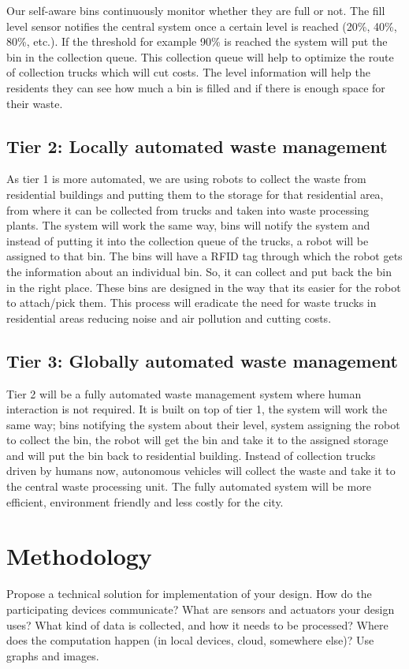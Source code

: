 \documentclass{article}
\begin{document}
Our self-aware bins continuously monitor whether they are full or not. The fill level sensor notifies the central system once a certain level is reached (20\%, 40\%, 80\%, etc.). If the threshold for example 90\% is reached the system will put the bin in the collection queue. This collection queue will help to optimize the route of collection trucks which will cut costs. The level information will help the residents they can see how much a bin is filled and if there is enough space for their waste.

\subsection{Tier 2: Locally automated waste management}

As tier 1 is more automated, we are using robots to collect the waste from residential buildings and putting them to the storage for that residential area, from where it can be collected from trucks and taken into waste processing plants. The system will work the same way, bins will notify the system and instead of putting it into the collection queue of the trucks, a robot will be assigned to that bin. The bins will have a RFID tag through which the robot gets the information about an individual bin. So, it can collect and put back the bin in the right place. These bins are designed in the way that its easier for the robot to attach/pick them. This process will eradicate the need for waste trucks in residential areas reducing noise and air pollution and cutting costs.

\subsection{Tier 3: Globally automated waste management}

Tier 2 will be a fully automated waste management system where human interaction is not required. It is built on top of tier 1, the system will work the same way; bins notifying the system about their level, system assigning the robot to collect the bin, the robot will get the bin and take it to the assigned storage and will put the bin back to residential building. Instead of collection trucks driven by humans now, autonomous vehicles will collect the waste and take it to the central waste processing unit. The fully automated system will be more efficient, environment friendly and less costly for the city. 


\section{Methodology}
Propose a technical solution for implementation of your design. How do the participating devices
communicate? What are sensors and actuators your design uses? What kind of data is collected, and
how it needs to be processed? Where does the computation happen (in local devices, cloud, somewhere
else)? Use graphs and images.
\end{document}
